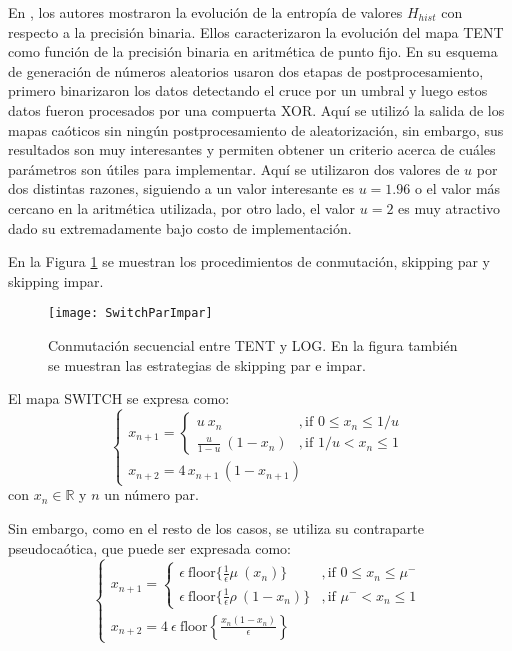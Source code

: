 En \cite{DelaFraga2017}, los autores mostraron la evolución de la entropía de valores $H_{hist}$ con respecto a la precisión binaria. Ellos caracterizaron la evolución del mapa TENT como función de la precisión binaria en aritmética de punto fijo.
En su esquema de generación de números aleatorios usaron dos etapas de postprocesamiento, primero binarizaron los datos detectando el cruce por un umbral y luego estos datos fueron procesados por una compuerta XOR.
Aquí se utilizó la salida de los mapas caóticos sin ningún postprocesamiento de aleatorización, sin embargo, sus resultados son muy interesantes y permiten obtener un criterio acerca de cuáles parámetros son útiles para implementar.
Aquí se utilizaron dos valores de $u$ por dos distintas razones, siguiendo a \cite{DelaFraga2017} un valor interesante es $u = 1.96$ o el valor más cercano en la aritmética utilizada, por otro lado, el valor $u=2$ es muy atractivo dado su extremadamente bajo costo de implementación.

En la Figura \ref{fig:seq} se muestran los procedimientos de conmutación, skipping par y skipping impar.

\begin{figure}[htpb]
\centering	
	\texttt{[image: SwitchParImpar]}
	\caption{Conmutación secuencial entre TENT y LOG. En la figura también se muestran las estrategias de skipping par e impar.} \label{fig:seq}
\end{figure}

El mapa SWITCH se expresa como:
%
\begin{equation}\label{eq:SWITCH}
\begin{cases}
x_{n+1}=
\begin{cases}
u~x_n &, \textrm{if } 0\leq x_n\leq 1/u\\
\frac{u}{1-u}~(1-x_n) &, \textrm{if } 1/u< x_n\leq 1 
\end{cases} \\
x_{n+2}=4\,x_{n+1}\,(1-x_{n+1})
\end{cases}
\end{equation}
%
con $x_n \in \mathbb{R}$ y $n$ un número par.

Sin embargo, como en el resto de los casos, se utiliza su contraparte pseudocaótica, que puede ser expresada como:
%
\begin{equation}\label{eq:SWITCHB2}
\begin{cases}
x_{n+1}=
\begin{cases}
\epsilon ~\text{floor} \{\frac{1}{\epsilon} \mu~(x_n)\} &, \textrm{if } 0\leq x_n\leq \mu^-\\
\epsilon ~\text{floor} \{\frac{1}{\epsilon} \rho~(1-x_n)\} &, \textrm{if } \mu^-<x_n\leq 1
\end{cases} \\
x_{n+2}=4 ~\epsilon ~\text{floor}\left\{\frac{x_n(1-x_n)}{\epsilon}\right\}
\end{cases}
\end{equation}

